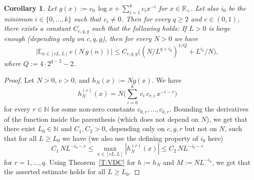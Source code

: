 \documentclass[11pt]{amsart}
\newtheorem{corollary}[lemma]{Corollary}
\theoremstyle{definition}
\newcommand{\E}{{\mathbb E}}
\newcommand{\N}{{\mathbb N}}
\newcommand{\R}{{\mathbb R}}
\begin{document}
 	\begin{corollary}\label{C:VDC}
 	Let  $g(x):=c_0\, \log x +\sum_{i=1}^kc_i x^{-i}$ for $x\in \R_+$. Let also
 	$i_0$ be the minimum   $i\in \{0,\ldots, k\}$ such that $c_i\neq 0$.
 	Then for every $q\geq 2$  and $c\in (0,1)$, there exists a constant $C_{c,q,g}$ such that the following holds: 	
 	 If
 	  $L>0$  is  large enough (depending only on  $c,q,g$),   then
 	  for every $N>0$ we have
 	$$
 	\big|\E_{n\in [cL,L]} \, e(N\,  g(n))\big|\leq C_{c,q,g}\big((N /L^{q+i_0})^{1/Q}+L^{i_0}/N\big),
 	$$
 	where $Q:=4\cdot 2^{q-2}-2$.	 	
 \end{corollary}
 	\begin{proof}
 		Let $N>0$,   $c>0$, and  $h_N(x):=Ng(x)$.
 		We have
 		$$
 		h_N^{(r)}(x)=N \big( \sum_{i=0}^k\, c_i\, c_{r,i} \, x^{-i-r}\big)
 		$$ for every $r\in \N$ for some non-zero constants $c_{0,r},\ldots,c_{k,r}$.
 		Bounding the derivatives of the function inside the parenthesis (which does not depend on $N$), we get  that there exist $L_0\in \N$ and  $C_1, C_2>0$, depending only on $c,g,r$ but not on $N$,  such that for   all $L\geq L_0$ we have (we also use the defining property of $i_0$ here)
 		$$
 		C_1\, N L^{-i_0-r}	\leq \max_{x\in [cL,L]} |h_N^{(r)}(x)|\leq C_2\, N L^{-i_0-r}
 		$$
 		for $r=1,\ldots, q$.
 		Using Theorem~\ref{T:VDC} for  $h:=h_N$ and $M:=NL^{-i_0}$, we get that the asserted estimate holds for all $L\geq L_0$.
 	\end{proof}
 	
\end{document}
